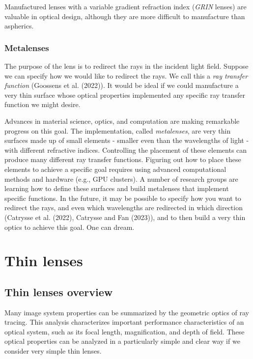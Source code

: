\documentclass[
  letterpaper,
]{book}
\begin{document}
Manufactured lenses with a variable gradient refraction index
(\emph{GRIN} lenses) are valuable in optical design, although they are
more difficult to manufacture than aspherics.

\subsection{Metalenses}\label{sec-optics-metalens}

The purpose of the lens is to redirect the rays in the incident light
field. Suppose we can specify how we would like to redirect the rays. We
call this a \emph{ray transfer function} (Goossens et al. (2022)). It
would be ideal if we could manufacture a very thin surface whose optical
properties implemented any specific ray transfer function we might
desire.

Advances in material science, optics, and computation are making
remarkable progress on this goal. The implementation, called
\emph{metalenses}, are very thin surfaces made up of small elements -
smaller even than the wavelengths of light - with different refractive
indices. Controlling the placement of these elements can produce many
different ray transfer functions. Figuring out how to place these
elements to achieve a specific goal requires using advanced
computational methods and hardware (e.g., GPU clusters). A number of
research groups are learning how to define these surfaces and build
metalenses that implement specific functions. In the future, it may be
possible to specify how you want to redirect the rays, and even which
wavelengths are redirected in which direction (Catrysse et al. (2022),
Catrysse and Fan (2023)), and to then build a very thin optics to
achieve this goal. One can dream.

\chapter{Thin lenses}\label{sec-optics-thinlens}

\section{Thin lenses overview}\label{sec-optics-thinlens-overview}

Many image system properties can be summarized by the geometric optics
of ray tracing. This analysis characterizes important performance
characteristics of an optical system, such as its focal length,
magnification, and depth of field. These optical properties can be
analyzed in a particularly simple and clear way if we consider very
simple thin lenses.
\end{document}
